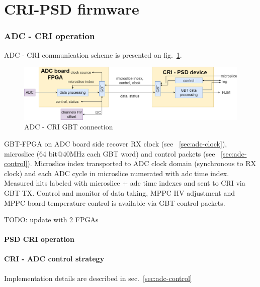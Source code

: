 \documentclass{article}
\begin{document}
\newpage
\part{CRI-PSD firmware}

\section{ADC - CRI operation}

ADC - CRI communication scheme is presented on fig.~\ref{fig:adc-cri}. 

\begin{figure}[H]
	\centering 
	\includegraphics[width=1.0\textwidth]{pic_scheme/CRI_PSD_link.png}
	\caption{\label{fig:adc-cri} ADC - CRI GBT connection}
\end{figure}

GBT-FPGA on ADC board side recover RX clock (see ~\ref{sec:adc-clock}), microslice (64 bit@40MHz each GBT word) and control packets (see ~\ref{sec:adc-control}). Microslice index transported to ADC clock domain (synchronous to RX clock) and each ADC cycle in microslice numerated with adc time index. Measured hits labeled with microslice + adc time indexes and sent to CRI via GBT TX. Control and monitor of data taking, MPPC HV adjustment and MPPC board temperature control is available via GBT control packets.

TODO: update with 2 FPGAs



\subsection{PSD CRI operation}



\subsection{CRI - ADC control strategy}\label{sec:cri-adc-ctrl}
Implementation details are described in sec.~\ref{sec:adc-control}
\end{document}
